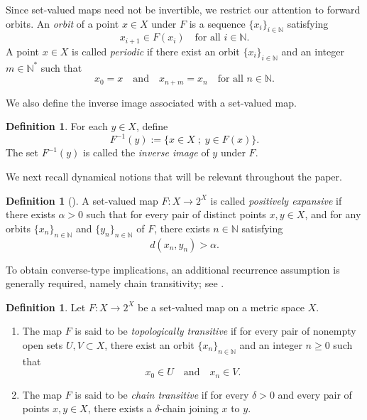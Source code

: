 \documentclass{amsart}
\theoremstyle{definition}
\newtheorem{definition}[theorem]{Definition}
\begin{document}
Since set-valued maps need not be invertible, we restrict our attention to forward orbits. An \emph{orbit} of a point $x\in X$ under $F$ is a sequence $\{x_i\}_{i\in\mathbb{N}}$ satisfying
\[
x_{i+1}\in F(x_i)
\quad \text{for all } i\in\mathbb{N}.
\]
A point $x\in X$ is called \emph{periodic} if there exist an orbit $\{x_i\}_{i\in\mathbb{N}}$ and an integer $m\in\mathbb{N}^*$ such that
\[
x_0=x
\quad \text{and} \quad
x_{n+m}=x_n
\quad \text{for all } n\in\mathbb{N}.
\]

We also define the inverse image associated with a set-valued map.

\begin{definition}
For each $y\in X$, define
\[
F^{-1}(y):=
\{x\in X \; ; \; y\in F(x)\}.
\]
The set $F^{-1}(y)$ is called the \emph{inverse image} of $y$ under $F$.
\end{definition}

We next recall dynamical notions that will be relevant throughout the paper.

\begin{definition}[\cite{RW}]
A set-valued map $F:X\to 2^X$ is called \emph{positively expansive} if there exists $\alpha>0$ such that for every pair of distinct points $x,y\in X$, and for any orbits $\{x_n\}_{n\in\mathbb{N}}$ and $\{y_n\}_{n\in\mathbb{N}}$ of $F$, there exists $n\in\mathbb{N}$ satisfying
\[
d(x_n,y_n)>\alpha.
\]
\end{definition}

To obtain converse-type implications, an additional recurrence assumption is generally required, namely chain transitivity; see \cite{WongSalleh2019,WS}.

\begin{definition}
Let $F:X\to 2^X$ be a set-valued map on a metric space $X$.

\begin{enumerate}
\item The map $F$ is said to be \emph{topologically transitive} if for every pair of nonempty open sets $U,V\subset X$, there exist an orbit $\{x_n\}_{n\in\mathbb{N}}$ and an integer $n\geq 0$ such that
\[
x_0\in U
\quad \text{and} \quad
x_n\in V.
\]

\item The map $F$ is said to be \emph{chain transitive} if for every $\delta>0$ and every pair of points $x,y\in X$, there exists a $\delta$-chain joining $x$ to $y$.
\end{enumerate}
\end{definition}
\end{document}
